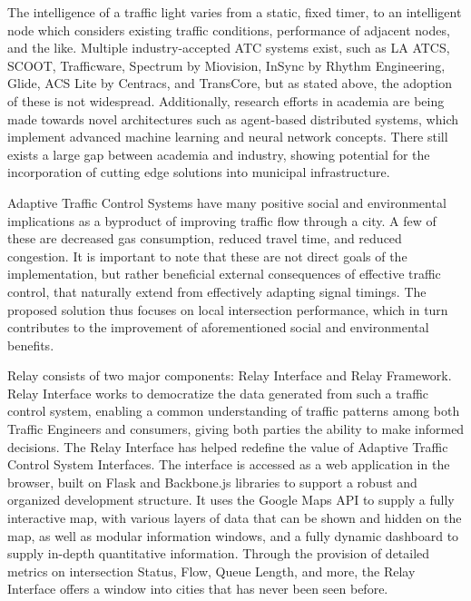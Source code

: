 \documentclass{report}
\begin{document}
The intelligence of a traffic light varies from a static, fixed timer, to an intelligent node which considers existing traffic conditions, performance of adjacent nodes, and the like.
Multiple industry-accepted ATC systems exist, such as LA ATCS, SCOOT, Trafficware, Spectrum by Miovision, InSync by Rhythm Engineering, Glide, ACS Lite by Centracs, and TransCore, but as stated above, the adoption of these is not widespread.
Additionally, research efforts in academia are being made towards novel architectures such as agent-based distributed systems, which implement advanced machine learning and neural network concepts\cite{1688100, 5073360, uot-article}.
There still exists a large gap between academia and industry, showing potential for the incorporation of cutting edge solutions into municipal infrastructure.

Adaptive Traffic Control Systems have many positive social and environmental implications as a byproduct of improving traffic flow through a city.
A few of these are decreased gas consumption, reduced travel time, and reduced congestion.
It is important to note that these are not direct goals of the implementation, but rather beneficial external consequences of effective traffic control, that naturally extend from effectively adapting signal timings.
The proposed solution thus focuses on local intersection performance, which in turn contributes to the improvement of aforementioned social and environmental benefits.

Relay consists of two major components: Relay Interface and Relay Framework. 
Relay Interface works to democratize the data generated from such a traffic control system, enabling a common understanding of traffic patterns among both Traffic Engineers and consumers, giving both parties the ability to make informed decisions.
The Relay Interface has helped redefine the value of Adaptive Traffic Control System Interfaces.
The interface is accessed as a web application in the browser, built on Flask and Backbone.js libraries to support a robust and organized development structure.
It uses the Google Maps API to supply a fully interactive map, with various layers of data that can be shown and hidden on the map, as well as modular information windows, and a fully dynamic dashboard to supply in-depth quantitative information.
Through the provision of detailed metrics on intersection Status, Flow, Queue Length, and more, the Relay Interface offers a window into cities that has never been seen before.
\end{document}

